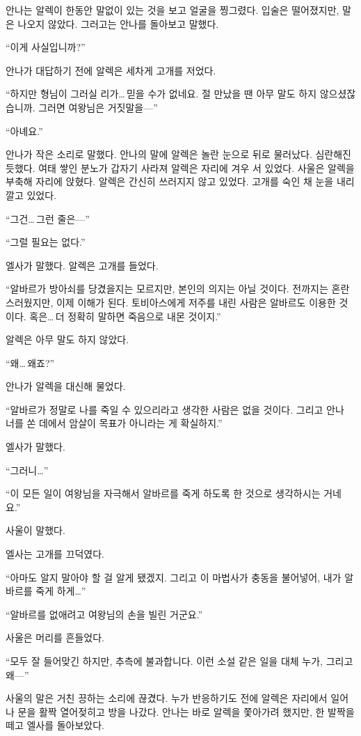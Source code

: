 안나는 알렉이 한동안 말없이 있는 것을 보고 얼굴을 찡그렸다. 입술은 떨어졌지만, 말은 나오지 않았다. 그러고는 안나를 돌아보고 말했다.

``이게 사실입니까?''

안나가 대답하기 전에 알렉은 세차게 고개를 저었다.

``하지만 형님이 그러실 리가\ldots\,믿을 수가 없네요. 절 만났을 땐 아무 말도 하지 않으셨잖습니까. 그러면 여왕님은 거짓말을—''

``아녜요.''

안나가 작은 소리로 말했다. 안나의 말에 알렉은 놀란 눈으로 뒤로 물러났다. 심란해진 듯했다. 여태 쌓인 분노가 갑자기 사라져 알렉은 자리에 겨우 서 있었다. 사울은 알렉을 부축해 자리에 앉혔다. 알렉은 간신히 쓰러지지 않고 있었다. 고개를 숙인 채 눈을 내리깔고 있었다.

``그건\ldots\,그런 줄은—''

``그럴 필요는 없다.''

엘사가 말했다. 알렉은 고개를 들었다.

``알바르가 방아쇠를 당겼을지는 모르지만, 본인의 의지는 아닐 것이다. 전까지는 혼란스러웠지만, 이제 이해가 된다. 토비아스에게 저주를 내린 사람은 알바르도 이용한 것이다. 혹은\ldots\,더 정확히 말하면 죽음으로 내몬 것이지.''

알렉은 아무 말도 하지 않았다.

``왜\ldots\,왜죠?''

안나가 알렉을 대신해 물었다.

``알바르가 정말로 나를 죽일 수 있으리라고 생각한 사람은 없을 것이다. 그리고 안나 너를 쏜 데에서 암살이 목표가 아니라는 게 확실하지.''

엘사가 말했다.

``그러니\ldots''

``이 모든 일이 여왕님을 자극해서 알바르를 죽게 하도록 한 것으로 생각하시는 거네요.''

사울이 말했다.

엘사는 고개를 끄덕였다.

``아마도 알지 말아야 할 걸 알게 됐겠지. 그리고 이 마법사가 충동을 불어넣어, 내가 알바르를 죽게 하게\ldots''

``알바르를 없애려고 여왕님의 손을 빌린 거군요.''

사울은 머리를 흔들었다.

``모두 잘 들어맞긴 하지만, 추측에 불과합니다. 이런 소설 같은 일을 대체 누가, 그리고 왜—''

사울의 말은 거친 끙하는 소리에 끊겼다. 누가 반응하기도 전에 알렉은 자리에서 일어나 문을 활짝 열어젖히고 방을 나갔다. 안나는 바로 알렉을 쫓아가려 했지만, 한 발짝을 떼고 엘사를 돌아보았다.

